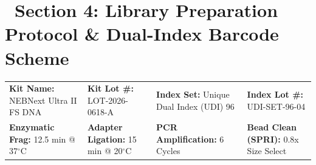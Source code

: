 \documentclass[10pt,a4paper]{article}
\begin{document}
\vspace{8pt}

\section{\faBarcode\ Section 4: Library Preparation Protocol \& Dual-Index Barcode Scheme}

\begin{tcolorbox}[
  enhanced,
  colback=LightBg,
  colframe=BorderGray,
  arc=2pt,
  boxrule=0.5pt,
  top=6pt, bottom=6pt, left=8pt, right=8pt
]
  \fontsize{8pt}{10.5pt}\selectfont
  \begin{tabularx}{\linewidth}{@{}X X X X@{}}
    \textbf{Kit Name:} NEBNext Ultra II FS DNA & \textbf{Kit Lot \#:} LOT-2026-0618-A & \textbf{Index Set:} Unique Dual Index (UDI) 96 & \textbf{Index Lot \#:} UDI-SET-96-04 \\
    \textbf{Enzymatic Frag:} 12.5 min @ 37\ensuremath{^\circ}C & \textbf{Adapter Ligation:} 15 min @ 20\ensuremath{^\circ}C & \textbf{PCR Amplification:} 6 Cycles & \textbf{Bead Clean (SPRI):} 0.8x Size Select \\
  \end{tabularx}
\end{tcolorbox}

\vspace{4pt}
\end{document}
